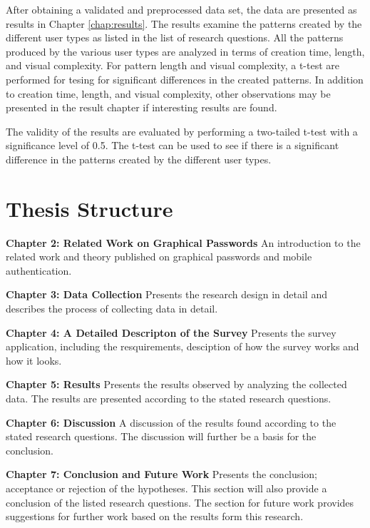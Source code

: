       After obtaining a validated and preprocessed data set, the data are presented as results in Chapter \ref{chap:results}. The results examine the patterns created by the different user types as listed in the list of research questions. All the patterns produced by the various user types are analyzed in terms of creation time, length, and visual complexity. For pattern length and visual complexity, a t-test are performed for tesing for significant differences in the created patterns. In addition to creation time, length, and visual complexity, other observations may be presented in the result chapter if interesting results are found. 

      The validity of the results are evaluated by performing a two-tailed t-test with a significance level of 0.5. The t-test can be used to see if there is a significant difference in the patterns created by the different user types.

  \clearpage
  \section{Thesis Structure} \label{sec:structure}

    {\bf Chapter 2: Related Work on Graphical Passwords}
    An introduction to the related work and theory published on graphical passwords and mobile authentication.

    {\bf Chapter 3: Data Collection}
    Presents the research design in detail and describes the process of collecting data in detail.

    {\bf Chapter 4: A Detailed Descripton of the Survey}
    Presents the survey application, including the resquirements, desciption of how the survey works and how it looks. 

    {\bf Chapter 5: Results}
    Presents the results observed by analyzing the collected data. The results are presented according to the stated research questions.

    {\bf Chapter 6: Discussion}
    A discussion of the results found according to the stated research questions. The discussion will further be a basis for the conclusion. 

    {\bf Chapter 7: Conclusion and Future Work}
    Presents the conclusion; acceptance or rejection of the hypotheses. This section will also provide a conclusion of the listed research questions. The section for future work provides suggestions for further work based on the results form this research. 

  \clearpage
\mbox{}
\newpage